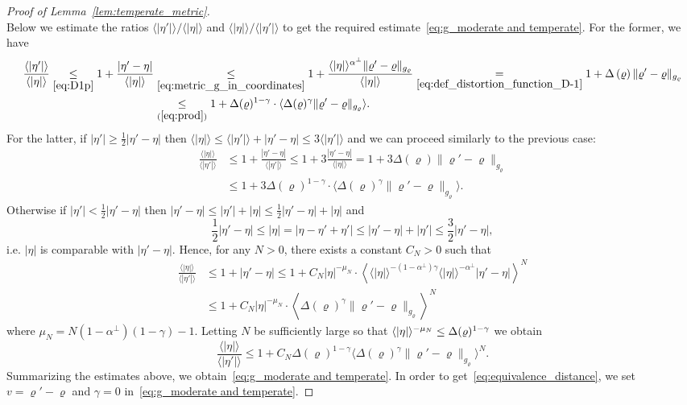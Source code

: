 \documentclass[AHL,Unicode,longabstracts,published]{cedram}
\newcommand*\ineq[1]{\underset{(#1)}{\leq}}
\begin{document}
\begin{proof}[Proof of Lemma~\ref{lem:temperate_metric}]
\begin{equation}
\end{equation}
Below we estimate the ratios $\langle|\eta'|\rangle/\langle|\eta|\rangle$ and $\langle|\eta|\rangle/\langle|\eta'|\rangle$ to get the required estimate~\eqref{eq:g_moderate and temperate}. For the former, we have
\begin{align}
\frac{\langle|\eta'|\rangle}{\langle|\eta|\rangle}\underset{\eqref{eq:D1p}}{\leq}1+\frac{\left|\eta'-\eta\right|}{\langle|\eta|\rangle} & \underset{\eqref{eq:metric_g_in_coordinates}}{\leq}1+\frac{\langle\left|\eta\right|\rangle^{\alpha^{\perp}}\|\varrho'-\varrho\|_{g_{\varrho}}}{\left\langle \left|\eta\right|\right\rangle }\underset{\eqref{eq:def_distortion_function_D-1}}{=} 1+\Delta\left(\varrho\right)\|\varrho'-\varrho\|_{g_{\varrho}}\label{eq:res1-1}
\\
& \ineq{\ref{eq:prod}}1+\Delta(\varrho)^{1-\gamma}\cdot\langle\Delta(\varrho)^{\gamma}\|\varrho'-\varrho\|_{g_{\varrho}}\rangle.
\end{align}
For the latter, if $|\eta'|\ge\frac{1}{2}|\eta'-\eta|$ then $\langle|\eta|\rangle\leq\langle|\eta'|\rangle+|\eta'-\eta|\le3\langle|\eta'|\rangle$ and we can proceed similarly to the previous case:
\begin{align*}
\frac{\langle|\eta|\rangle}{\langle|\eta'|\rangle} &\leq1+\frac{\left|\eta'-\eta\right|}{\langle|\eta'|\rangle}\leq1+3\frac{\left|\eta'-\eta\right|}{\langle|\eta|\rangle}=1+3\Delta\left(\varrho\right)\|\varrho'-\varrho\|_{g_{\varrho}}\\
&\le1+3\Delta(\varrho)^{1-\gamma}\cdot\langle\Delta(\varrho)^{\gamma}\|\varrho'-\varrho\|_{g_{\varrho}}\rangle.
\end{align*}
Otherwise if $|\eta'|<\frac{1}{2}|\eta'-\eta|$ then $|\eta'-\eta|\leq|\eta'|+|\eta|\leq\frac{1}{2}|\eta'-\eta|+|\eta|$ and
\[
\frac{1}{2}|\eta'-\eta|\leq\left|\eta\right|=|\eta-\eta'+\eta'|\leq|\eta'-\eta|+|\eta'|\leq\frac{3}{2}|\eta'-\eta|,
\]
i.e. $|\eta|$ is comparable with $|\eta'-\eta|$. Hence, for any $N>0$, there exists a constant $C_{N}>0$ such that
\[
\begin{aligned}\frac{\langle|\eta|\rangle}{\langle|\eta'|\rangle} & \leq1+|\eta'-\eta|\leq1+C_{N}|\eta|^{-\mu_{N}}\cdot\left\langle \langle|\eta|\rangle^{-(1-\alpha^{\perp})\gamma}\langle|\eta|\rangle^{-\alpha^{\perp}}|\eta'-\eta|\right\rangle ^{N}\\
& \leq1+C_{N}|\eta|^{-\mu_{N}}\cdot\left\langle \Delta\left(\varrho\right)^{\gamma}\|\varrho'-\varrho\|_{g_{\varrho}}\right\rangle ^{N}
\end{aligned}
\]
where $\mu_{N}=N(1-\alpha^{\perp})(1-\gamma)-1.$ Letting $N$ be sufficiently large so that $\langle |\eta|\rangle ^{-\mu_{N}}\linebreak\leq\Delta(\varrho)^{1-\gamma}$ we obtain
\[
\frac{\langle|\eta|\rangle}{\langle|\eta'|\rangle}\le1+C_{N}\Delta(\varrho)^{1-\gamma}\langle\Delta\left(\varrho\right)^{\gamma}\|\varrho'-\varrho\|_{g_{\varrho}}\rangle^{N}.
\]
Summarizing the estimates above, we obtain~\eqref{eq:g_moderate and temperate}. In order to get~\eqref{eq:equivalence_distance}, we set $v=\varrho'-\varrho$ and $\gamma=0$ in~\eqref{eq:g_moderate and temperate}.
\end{proof}
\end{document}
